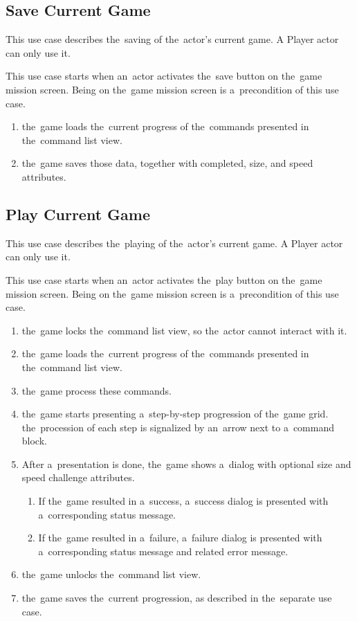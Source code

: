 \subsection{Save Current Game}

This use case describes the~saving of the~actor's current game.
A Player actor can only use it.

This use case starts when an~actor activates the~save button on the~game mission screen.
Being on the~game mission screen is a~precondition of this use case.

\begin{enumerate}
    \item the~game loads the~current progress of the~commands presented in the~command list view.
    \item the~game saves those data, together with completed, size, and speed attributes. 
\end{enumerate}

\subsection{Play Current Game}

This use case describes the~playing of the~actor's current game.
A Player actor can only use it.

This use case starts when an~actor activates the~play button on the~game mission screen.
Being on the~game mission screen is a~precondition of this use case.

\begin{enumerate}
    \item the~game locks the~command list view, so the~actor cannot interact with it. 
    \item the~game loads the~current progress of the~commands presented in the~command list view.
    \item the~game process these commands.
    \item the~game starts presenting a~step-by-step progression of the~game grid.
    the~procession of each step is signalized by an~arrow next to a~command block.
    \item After a~presentation is done, the~game shows a~dialog with optional size and speed challenge attributes.
    \begin{enumerate}
        \item If the~game resulted in a~success, a~success dialog is presented with a~corresponding status message.
        \item If the~game resulted in a~failure, a~failure dialog is presented with a~corresponding status message and related error message.
    \end{enumerate}
    \item the~game unlocks the~command list view.
    \item the~game saves the~current progression, as described in the~separate use case. 
\end{enumerate}

